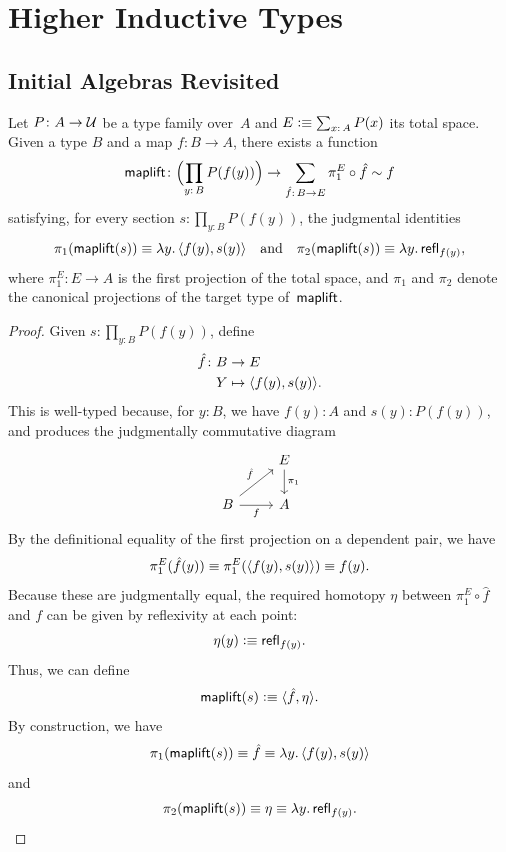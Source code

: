 \chapter{Higher Inductive Types}

\section{Initial Algebras Revisited}

\begin{thm}{}\label{thm:map-lift}
    Let\/ $P\colon A\to\univ$ be a type family over\/~$A$ and\/ $E\defeq\sum_{x\colon A}P(x)$ its total space. Given a type\/ $B$ and a map\/ $f\colon B\to A$, there exists a function
    \[
        \fun{maplift}\colon
            \Bigl(
                \prod_{y\colon B}P(f(y))
            \Bigr)
            \to\sum_{\hat f\colon B\to E}
                \pi_1^E\circ\hat f\sim f
    \]
    satisfying, for every section\/ $s\colon\prod_{y\colon B}P(f(y))$, the judgmental identities
    \[
        \pi_1(\mathsf{maplift}(s))\equiv\lambda y.\,\langle f(y),s(y)\rangle
        \quad\text{and}\quad
        \pi_2(\mathsf{maplift}(s))\equiv\lambda y.\,\mathsf{refl}_{f(y)},
    \]
    where\/ $\pi_1^E\colon E\to A$ is the first projection of the total space, and $\pi_1$ and\/ $\pi_2$ denote the canonical projections of the target type of\/~$\mathsf{maplift}$.
\end{thm}

\begin{proof}
    Given $s\colon\prod_{y\colon B}P(f(y))$, define
    \begin{align*}
        \hat f\colon B&\to E\\
        Y&\mapsto\dep{f(y),s(y)}.
    \end{align*}
    This is well-typed because, for $y\colon B$, we have $f(y)\colon A$ and $s(y)\colon P(f(y))$, and produces the judgmentally commutative diagram
    \[
        \begin{tikzcd}
                &E
                    \arrow[d,"\pi_1"]\\
            B
                    \arrow[ru,"\hat f"]
                    \arrow[r,"f"']
                &A
        \end{tikzcd}
    \]
    By the definitional equality of the first projection on a dependent pair, we have
    \[
        \pi_1^E(\hat{f}(y))\equiv\pi_1^E(\langle f(y),s(y)\rangle)\equiv f(y).
    \]
    Because these are judgmentally equal, the required homotopy $\eta$ between $\pi_1^E\circ\hat{f}$ and $f$ can be given by reflexivity at each point:
    \[
        \eta(y)\mathrel{\vcentcolon}\equiv\mathsf{refl}_{f(y)}.
    \]
    Thus, we can define
    \[
        \mathsf{maplift}(s)\mathrel{\vcentcolon}\equiv\langle\hat{f},\eta\rangle. 
    \]
    By construction, we have
    \[
        \pi_1(\mathsf{maplift}(s))\equiv\hat{f}\equiv\lambda y.\,\langle f(y),s(y)\rangle
    \]
    and
    \[
        \pi_2(\mathsf{maplift}(s))\equiv \eta\equiv\lambda y.\,\mathsf{refl}_{f(y)}.
    \]
\end{proof}

